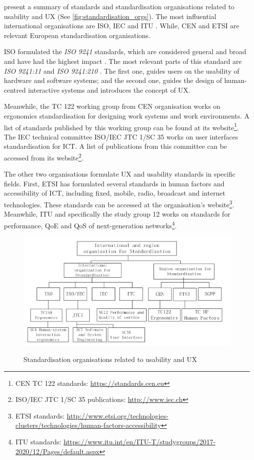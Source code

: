 \textcite{Ran2015} present a summary of standards and standardisation organisations related to usability and \ac{UX} (See \autoref{fig:standardisation_orgs}). The most influential international organisations are \ac{ISO}, \ac{IEC} and \ac{ITU} \autocite{Ran2015}. While, \ac{CEN} and \ac{ETSI} are relevant European standardisation organisations.

\ac{ISO} formulated the \textit{ISO 9241} standards, which are considered general and broad and have had the highest impact \autocite{Ran2015}. The most relevant parts of this standard are \textit{ISO 9241:11} \autocite{iso9241:11} and \textit{ISO 9241:210} \autocite{iso9241:210}. The first one, guides users on the usability of hardware and software systems; and the second one, guides the design of human-centred interactive systems and introduces the concept of \ac{UX}.

Meanwhile, the TC 122 working group from \ac{CEN} organisation works on ergonomics standardisation for designing work systems and work environments. A list of standards published by this working group can be found at its website\footnote{\ac{CEN} TC 122 standards: \url{https://standards.cen.eu}}. The \ac{IEC} technical committee ISO/IEC JTC 1/SC 35 works on user interfaces standardisation for \ac{ICT}. A list of publications from this committee can be accessed from its website\footnote{ISO/IEC JTC 1/SC 35 publications: \url{http://www.iec.ch}}.

The other two organisations formulate \ac{UX} and usability standards in specific fields. First, \ac{ETSI} has formulated several standards in human factors and accessibility of \ac{ICT}, including fixed, mobile, radio, broadcast and internet technologies. These standards can be accessed at the organisation's website\footnote{\ac{ETSI} standards: \url{http://www.etsi.org/technologies-clusters/technologies/human-factors-accessibility}}. Meanwhile, \ac{ITU} and specifically the study group 12 works on standards for performance, \ac{QoE} and \ac{QoS} of next-generation networks\footnote{\ac{ITU} standards: \url{https://www.itu.int/en/ITU-T/studygroups/2017-2020/12/Pages/default.aspx}}.

\begin{figure}[htb]
\myfloatalign
{\includegraphics[width=\linewidth]{gfx/standard/standardisation_orgs}} \quad
\caption[Standardisation organisations related to usability and \ac{UX}]{Standardisation organisations related to usability and \ac{UX} \autocite{Ran2015}}\label{fig:standardisation_orgs}
\end{figure}

